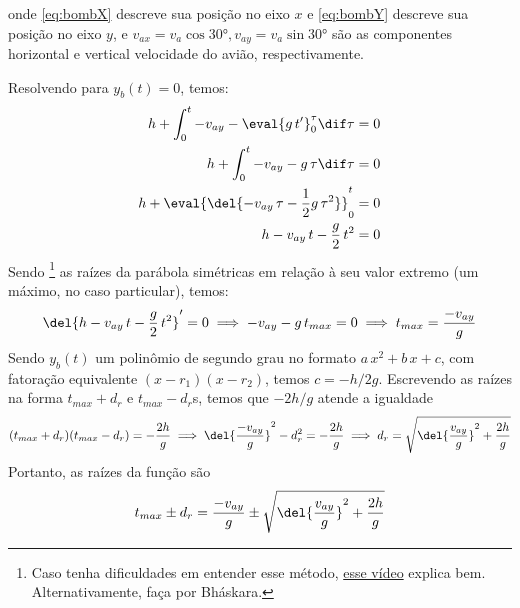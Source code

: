 \documentclass[]{IMTexam}
\begin{document}
\begin{questions}
\begin{solution}
\begin{multi}
		\end{multi}

		onde \ref{eq:bombX} descreve sua posição no eixo $ x $ e \ref{eq:bombY} descreve sua posição no eixo $ y $, e $ v_{ax}=v_a\cos\ang{30}, v_{ay}=v_a\sin\ang{30} $ são as componentes horizontal e vertical velocidade do avião, respectivamente.

		Resolvendo para $ y_b(t)=0 $, temos:
		\begin{align*}
			h+\int_{0}^{t} -v_{ay}-\eval{g\,t'}_{0}^{\tau}\dif\tau       & =0 \\
			h+\int_{0}^{t} -v_{ay}-g\,\tau\dif\tau                       & =0 \\
			h+\eval{\del{-v_{ay}\,\tau-\dfrac{1}{2}g\,\tau^{2}}}_{0}^{t} & =0 \\
			h-v_{ay}\,t-\dfrac{g}{2}\,t^{2}                              & =0
		\end{align*}
		Sendo
		\footnote{Caso tenha dificuldades em entender esse método, \href{https://www.youtube.com/watch?v=MHXO86wKeDY}{esse vídeo} explica bem. Alternativamente, faça por Bháskara.} as raízes da parábola simétricas em relação à seu valor extremo (um máximo, no caso particular), temos:
		\[ \del{h-v_{ay}\,t-\dfrac{g}{2}\,t^{2}}'=0\implies -v_{ay}-g\,t_{max}=0\implies t_{max}=\dfrac{-v_{ay}}{g} \]
		Sendo $ y_b(t) $ um polinômio de segundo grau no formato $ a\,x^{2}+b\,x+c $, com fatoração equivalente $ (x-r_1)(x-r_2) $, temos $ c=-h/2g $.
		Escrevendo as raízes na forma $ t_{max}+d_r $ e $ t_{max}-d_r $s, temos que $ -2h/g $ atende a igualdade
		\[ (t_{max}+d_r)(t_{max}-d_r)=-\dfrac{2h}{g}\implies \del{\dfrac{-v_{ay}}{g}}^{2}-d_r^{2}=-\dfrac{2h}{g}\implies d_r=\sqrt{\del{\dfrac{v_{ay}}{g}}^{2}+\dfrac{2h}{g}} \]
		Portanto, as raízes da função são
		\[ t_{max}\pm d_r=\dfrac{-v_{ay}}{g}\pm\sqrt{\del{\dfrac{v_{ay}}{g}}^{2}+\dfrac{2h}{g}} \]


\end{solution}
\end{questions}
\end{document}
